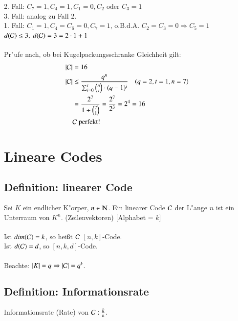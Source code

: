 2. Fall: $C_7=1,C_4=1,C_1=0,C_2 \text{ oder } C_3=1$ \\
3. Fall: analog zu Fall 2.\\
1. Fall: $C_1=1,C_4=C_6=0, C_7=1$, o.B.d.A. $C_2=C_3=0 \Rightarrow C_5=1$\\
$d(\mathcal{C}) \leq 3,\ d(\mathcal{C})=3=2 \cdot 1 + 1$\\
\\
Pr"ufe nach, ob bei Kugelpackungsschranke Gleichheit gilt:
\begin{align*}
	\left|\mathcal{C}\right| &=16\\
	\left|\mathcal{C}\right| &\leq \frac{q^n}{\sum_{i=0}^t \binom{n}{i} \cdot (q-1)^i} \quad (q=2, t=1, n=7)\\
	&=\frac{2^7}{1+\binom{7}{1}}=\frac{2^7}{2^3}=2^4=16\\
	&\mathcal{C}\text{ perfekt!}
\end{align*}

\section{Lineare Codes}
\subsection{Definition: linearer Code}
Sei $K$ ein endlicher K"orper, $n \in \N$. Ein linearer Code $\mathcal{C}$ der L"ange $n$ ist ein Unterraum von $K^n$. (Zeilenvektoren) [Alphabet = $k$] \\
\\
Ist $dim(\mathcal{C})=k$, so hei\ss t $\mathcal{C}$ $\left[n,k\right]$-Code.\\
Ist $d(\mathcal{C})=d$, so $\left[ n,k,d \right]$-Code. \\
\\
Beachte: $\left| K \right| = q \Rightarrow \left| \mathcal{C} \right| =q^k$.\\
\subsection{Definition: Informationsrate}
Informationsrate (Rate) von $\mathcal{C}: \frac{k}{n}$.\\

